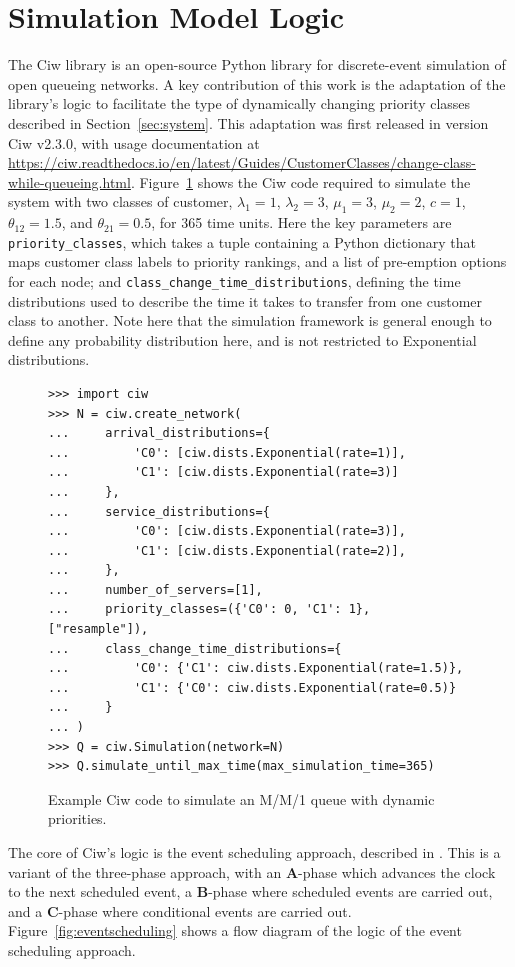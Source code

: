 \documentclass{article}
\begin{document}
\section{Simulation Model Logic}\label{sec:simulation}
The Ciw library \cite{palmer19} is an open-source Python library for
discrete-event simulation of open queueing networks. A key contribution of this
work is the adaptation of the library's logic to facilitate the type of
dynamically changing priority classes described in Section~\ref{sec:system}.
This adaptation was first released in version Ciw v2.3.0, with usage
documentation at
\url{https://ciw.readthedocs.io/en/latest/Guides/CustomerClasses/change-class-while-queueing.html}.
Figure~\ref{fig:ciwcode} shows the Ciw code
required to simulate the system with two classes of customer, $\lambda_1 = 1$,
$\lambda_2 = 3$, $\mu_1 = 3$, $\mu_2 = 2$, $c = 1$, $\theta_{12} =1.5$, and
$\theta_{21} = 0.5$, for 365 time units. Here the key parameters are
\texttt{priority_classes}, which takes a tuple containing a Python
dictionary that maps
customer class labels to priority rankings, and a list of pre-emption options
for each node; and \texttt{class_change_time_distributions},
defining the time distributions used to describe the time it takes to transfer
from one customer class to another. Note here that the simulation framework is
general enough to define any probability distribution here, and is not
restricted to Exponential distributions.

\begin{figure}
\begin{verbatim}
>>> import ciw
>>> N = ciw.create_network(
...     arrival_distributions={
...         'C0': [ciw.dists.Exponential(rate=1)],
...         'C1': [ciw.dists.Exponential(rate=3)]
...     },
...     service_distributions={
...         'C0': [ciw.dists.Exponential(rate=3)],
...         'C1': [ciw.dists.Exponential(rate=2)],
...     },
...     number_of_servers=[1],
...     priority_classes=({'C0': 0, 'C1': 1}, ["resample"]),
...     class_change_time_distributions={
...         'C0': {'C1': ciw.dists.Exponential(rate=1.5)},
...         'C1': {'C0': ciw.dists.Exponential(rate=0.5)}
...     }
... )
>>> Q = ciw.Simulation(network=N)
>>> Q.simulate_until_max_time(max_simulation_time=365)
\end{verbatim}
\caption{Example Ciw code to simulate an M/M/1 queue with dynamic priorities.}
\label{fig:ciwcode}
\end{figure}

The core of Ciw's logic is the event scheduling approach, described in
\cite{robinson14}. This is a variant of the three-phase approach, with an
\textbf{A}-phase which advances the clock to the next scheduled event, a
\textbf{B}-phase where scheduled events are carried out, and a \textbf{C}-phase
where conditional events are carried out. Figure~\ref{fig:eventscheduling} shows
a flow diagram of the logic of the event scheduling approach.
\end{document}
